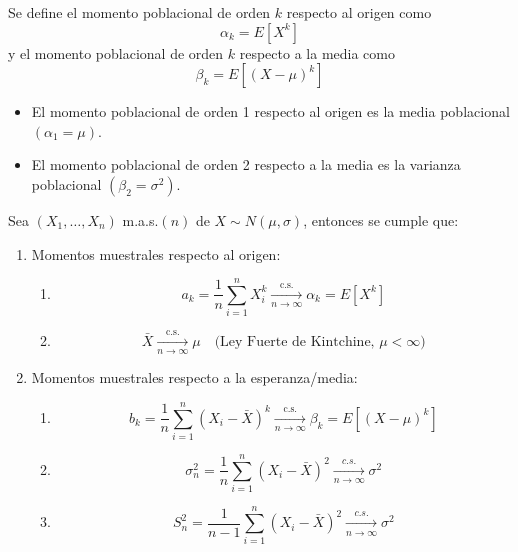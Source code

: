 \begin{definición}
Se define el momento poblacional de orden $k$ respecto al origen como
\[\alpha_{k}=E\left[X^{k}\right]\]
y el momento poblacional de orden $k$ respecto a la media como
\[\beta_{k}=E\left[(X-\mu)^{k}\right]\]
\end{definición}

\begin{observación}
\vspace{-\topsep} %
\vspace{-\topsep} %
\vspace{-\topsep} %
\begin{itemize}
	\item El momento poblacional de orden 1 respecto al origen es la media poblacional
	      $(\alpha_1 = \mu)$.
	\item El momento poblacional de orden 2 respecto a la media es la varianza
	      poblacional $(\beta_2 = \sigma^2)$.
\end{itemize}
\end{observación}

\begin{proposición}
Sea $\left(X_{1}, \ldots, X_{n}\right)$ m.a.s.$(n)$ de $X \sim N(\mu, \sigma)$, entonces se cumple que:
\begin{enumerate}
	\item Momentos muestrales respecto al origen:
	      \begin{enumerate}
		      \item $$    a_{k}=\frac{1}{n} \sum_{i=1}^{n} X_{i}^{k} \xrightarrow[n \rightarrow \infty]{\text{c.s.}} \alpha_{k}=E\left[X^{k}\right]$$
		      \item $$     \bar{X} \xrightarrow[n \rightarrow \infty]{\text{c.s.}} \mu \quad \text{(Ley Fuerte de Kintchine, } \mu<\infty \text{)}$$
	      \end{enumerate}
	\item Momentos muestrales respecto a la esperanza/media:
	      \begin{enumerate}
		      \item  $$b_{k}=\frac{1}{n} \sum_{i=1}^{n}\left(X_{i}-\bar{X}\right)^{k} \xrightarrow[n \rightarrow \infty]{\text{c.s.}} \beta_{k}=E\left[(X-\mu)^{k}\right]$$
		      \item $$ \sigma_n^2 = \frac{1}{n}\sum_{i = 1}^{n}(X_i - \bar{X})^2 \underset{n \to \infty}{\xrightarrow{c.s.}} \sigma^2 $$
		      \item $$ S_n^2 = \frac{1}{n-1}\sum_{i = 1}^{n}(X_i - \bar{X})^2\underset{n \to \infty}{\xrightarrow{c.s.}} \sigma^2 $$
	      \end{enumerate}
\end{enumerate}
\end{proposición}

